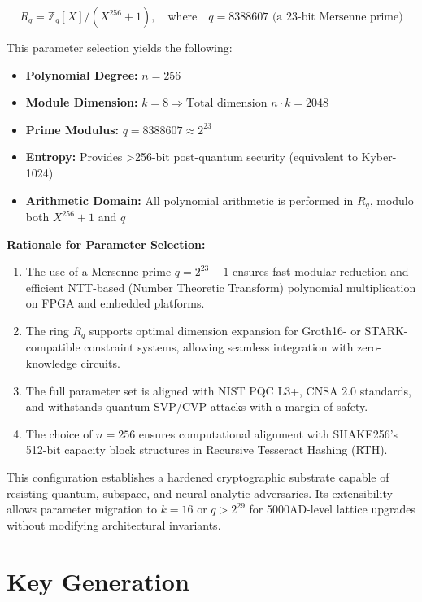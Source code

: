 \documentclass[12pt]{article}
\begin{document}
\[
R_q = \mathbb{Z}_q[X]/(X^{256} + 1), \quad \text{where} \quad q = 8388607 \text{ (a 23-bit Mersenne prime)}
\]

This parameter selection yields the following:

\begin{itemize}
    \item \textbf{Polynomial Degree:} \( n = 256 \)
    \item \textbf{Module Dimension:} \( k = 8 \Rightarrow \text{Total dimension } n \cdot k = 2048 \)
    \item \textbf{Prime Modulus:} \( q = 8388607 \approx 2^{23} \)
    \item \textbf{Entropy:} Provides >256-bit post-quantum security (equivalent to Kyber-1024)
    \item \textbf{Arithmetic Domain:} All polynomial arithmetic is performed in \( R_q \), modulo both \( X^{256} + 1 \) and \( q \)
\end{itemize}

\textbf{Rationale for Parameter Selection:}
\begin{enumerate}
    \item The use of a Mersenne prime \( q = 2^{23} - 1 \) ensures fast modular reduction and efficient NTT-based (Number Theoretic Transform) polynomial multiplication on FPGA and embedded platforms.
    \item The ring \( R_q \) supports optimal dimension expansion for Groth16- or STARK-compatible constraint systems, allowing seamless integration with zero-knowledge circuits.
    \item The full parameter set is aligned with NIST PQC L3+, CNSA 2.0 standards, and withstands quantum SVP/CVP attacks with a margin of safety.
    \item The choice of \( n = 256 \) ensures computational alignment with SHAKE256's 512-bit capacity block structures in Recursive Tesseract Hashing (RTH).
\end{enumerate}

This configuration establishes a hardened cryptographic substrate capable of resisting quantum, subspace, and neural-analytic adversaries. Its extensibility allows parameter migration to \( k = 16 \) or \( q > 2^{29} \) for 5000AD-level lattice upgrades without modifying architectural invariants.
\section*{Key Generation}
\end{document}
